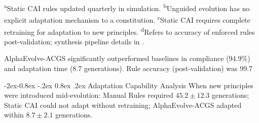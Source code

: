 \documentclass[manuscript,screen,9pt]{acmart}
\makeatletter
\renewcommand\subsubsection{\@startsection{subsubsection}{3}{\z@}%
  {-2ex\@plus -0.8ex \@minus -.2ex}%
  {0.8ex \@plus .2ex}%
  {\normalfont\normalsize\bfseries}}
\makeatother
\begin{document}
\begin{table}[htbp]
\begin{minipage}{\linewidth}\footnotesize \textsuperscript{a}Static CAI rules updated quarterly in simulation. \textsuperscript{b}Unguided evolution has no explicit adaptation mechanism to a constitution. \textsuperscript{c}Static CAI requires complete retraining for adaptation to new principles. \textsuperscript{d}Refers to accuracy of enforced rules post-validation; synthesis pipeline details in .\end{minipage}
\end{table}
AlphaEvolve-ACGS significantly outperformed baselines in compliance (94.9\%) and adaptation time (8.7 generations). Rule accuracy (post-validation) was 99.7%

\subsubsection{Adaptation Capability Analysis}
When new principles were introduced mid-evolution: Manual Rules required $45.2 \pm 12.3$ generations; Static CAI could not adapt without retraining; AlphaEvolve-ACGS adapted within $8.7 \pm 2.1$ generations.
\end{document}
